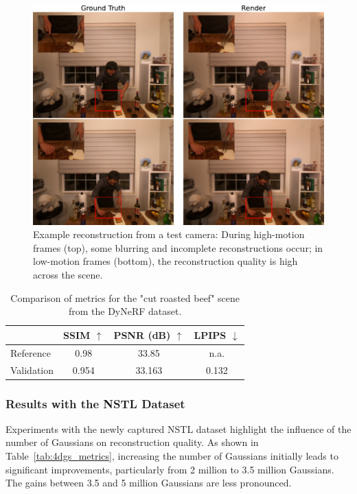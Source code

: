 \begin{figure}[h]
    \centering
    \includegraphics[width=\linewidth]{bilder/Results/Wang/DyNeRF/Vergleich_DyNeRF.pdf}
    \caption{Example reconstruction from a test camera: During high-motion frames (top), some blurring and incomplete reconstructions occur; in low-motion frames (bottom), the reconstruction quality is high across the scene.}
    \label{fig:DyNeRFVergleich}
\end{figure}

\begin{table}[h]
    \centering
    \caption{Comparison of metrics for the "cut roasted beef" scene from the DyNeRF dataset.}
    \label{tab:cut_roasted_beef_metrics}
    \begin{tabular}{lccc}
        \toprule
        & SSIM $\uparrow$ & PSNR (dB) $\uparrow$ & LPIPS $\downarrow$\\
        \midrule
        Reference \cite{yang2023gs4d} & 0.98 & 33.85 & n.a. \\
        Validation  &  0.954 & 33.163 & 0.132\\
        \bottomrule
    \end{tabular}
\end{table}

\FloatBarrier

\subsubsection{Results with the NSTL Dataset}
\label{sec:results_nstl}

Experiments with the newly captured NSTL dataset highlight the influence of the number of Gaussians on reconstruction quality. 
As shown in Table~\ref{tab:4dgs_metrics}, increasing the number of Gaussians initially leads to significant improvements, particularly from 2 million to 3.5 million Gaussians. 
The gains between 3.5 and 5 million Gaussians are less pronounced.

